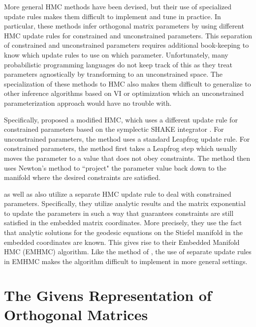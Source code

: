 \documentclass[ba]{imsart}
\numberwithin{equation}{section}
\theoremstyle{plain}
\begin{document}
\noindent More general HMC methods have been devised, but their use of specialized update rules makes them difficult to implement and tune in practice. In particular, these methods infer orthogonal matrix parameters by using different HMC update rules for constrained and unconstrained parameters. This separation of constrained and unconstrained parameters requires additional book-keeping to know which update rules to use on which parameter. Unfortunately, many probabilistic programming languages do not keep track of this as they treat parameters agnostically by transforming to an unconstrained space. The specialization of these methods to HMC also makes them difficult to generalize to other inference algorithms based on VI or optimization which an unconstrained parameterization approach would have no trouble with.

\noindent Specifically, \cite{brubaker2012family} proposed a modified HMC, which uses a different update rule for constrained parameters based on the symplectic SHAKE integrator \citep{leimkuhler2004simulating}. For unconstrained parameters, the method uses a standard Leapfrog update rule. For constrained parameters, the method first takes a Leapfrog step which usually moves the parameter to a value that does not obey constraints. The method then uses Newton's method to ``project" the parameter value back down to the manifold where the desired constraints are satisfied.

\noindent \citet{byrne2013geodesic} as well as \citet{holbrook2016bayesian} also utilize a separate HMC update rule to deal with constrained parameters. Specifically, they utilize analytic results and the matrix exponential to update the parameters in such a way that guarantees constraints are still satisfied in the embedded matrix coordinates. More precisely, they use the fact that analytic solutions for the geodesic equations on the Stiefel manifold in the embedded coordinates are known. This gives rise to their Embedded Manifold HMC (EMHMC) algorithm. Like the method of \cite{brubaker2012family}, the use of separate update rules in EMHMC makes the algorithm difficult to implement in more general settings.

\section{The Givens Representation of Orthogonal Matrices} \label{Givens}
\end{document}
